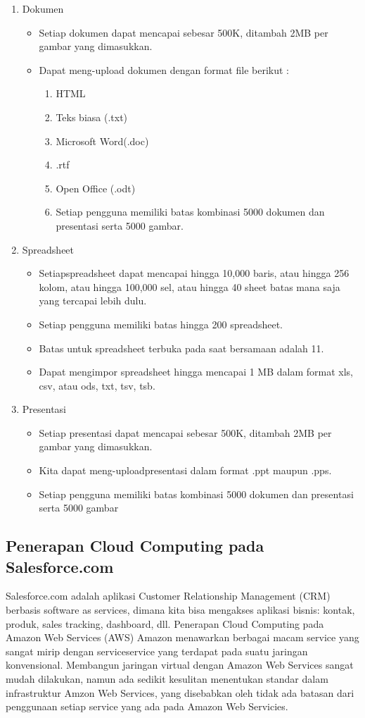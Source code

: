 \begin{enumerate}
\item Dokumen \\
\begin{itemize}
\item Setiap dokumen dapat mencapai sebesar 500K, ditambah 2MB per gambar yang dimasukkan.
\item Dapat meng-upload dokumen dengan format file berikut : \\
\begin{enumerate}
\item HTML
\item Teks biasa (.txt)
\item Microsoft Word(.doc)
\item .rtf
\item Open Office (.odt)
\item Setiap pengguna memiliki batas kombinasi 5000 dokumen dan presentasi serta 5000 gambar.
\end{enumerate}
\end{itemize}
\item Spreadsheet \\
\begin{itemize}
\item Setiapspreadsheet dapat mencapai hingga 10,000 baris, atau hingga 256 kolom, atau hingga 100,000 sel, atau hingga 40 sheet batas mana saja yang tercapai lebih dulu.
\item Setiap pengguna memiliki batas hingga 200 spreadsheet.
\item Batas untuk spreadsheet terbuka pada saat bersamaan adalah 11.
\item Dapat mengimpor spreadsheet hingga mencapai 1 MB dalam format xls, csv, atau ods, txt, tsv, tsb.
\end{itemize}
\item Presentasi \\
\begin{itemize}
\item Setiap presentasi dapat mencapai sebesar 500K, ditambah 2MB per gambar yang dimasukkan.
\item Kita dapat meng-uploadpresentasi dalam format .ppt maupun .pps.
\item Setiap pengguna memiliki batas kombinasi 5000 dokumen dan presentasi serta 5000 gambar
\end{itemize}
\end{enumerate}
\subsection{Penerapan Cloud Computing pada Salesforce.com}
\tab Salesforce.com adalah aplikasi Customer Relationship Management (CRM) berbasis
software as services, dimana kita bisa mengakses aplikasi bisnis: kontak, produk, sales tracking, dashboard, dll. Penerapan Cloud Computing pada Amazon Web Services (AWS) Amazon menawarkan berbagai macam service yang sangat mirip dengan serviceservice yang terdapat pada suatu jaringan konvensional. Membangun jaringan virtual dengan Amazon Web Services sangat mudah dilakukan, namun ada sedikit kesulitan menentukan standar dalam infrastruktur Amzon Web Services, yang disebabkan oleh tidak ada batasan dari penggunaan setiap service yang ada pada Amazon Web Servicies.
